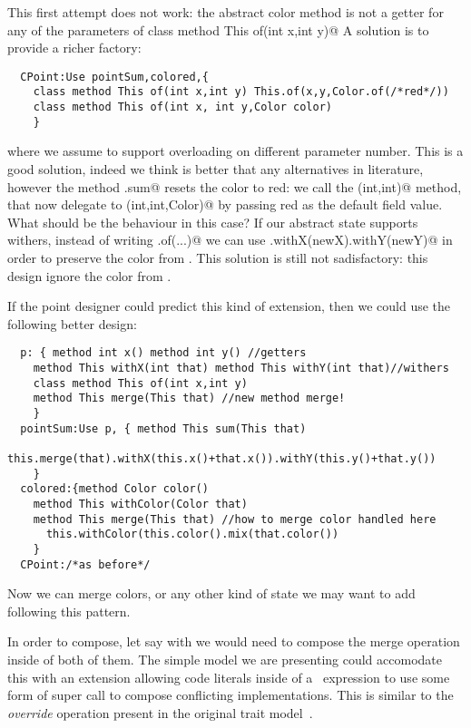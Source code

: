 This first attempt does not work: the abstract color method
is not a getter for any of the parameters of 
\Q@ class method This of(int x,int y)@
A solution is to provide a richer factory:

\begin{lstlisting}
  CPoint:Use pointSum,colored,{
    class method This of(int x,int y) This.of(x,y,Color.of(/*red*/))
    class method This of(int x, int y,Color color)
    }
\end{lstlisting}

where we assume to support overloading on different parameter number.
This is a good solution, indeed we think is better that any alternatives in literature,
however the method \Q@CPoint.sum@ resets the color to red: we call the \Q@of(int,int)@ method, that now delegate to \Q@of(int,int,Color)@ by passing red as the default field value.
What should be the behaviour in this case?
If our abstract state supports withers, instead of writing \Q@This.of(...)@ we can use
\Q@this.withX(newX).withY(newY)@ in order to preserve the color from \Q@this@.
This solution is still not sadisfactory: this design ignore the color from \Q@that@.

If the point designer could predict this kind of extension, then we could use the following better design:  
\begin{lstlisting}
  p: { method int x() method int y() //getters
    method This withX(int that) method This withY(int that)//withers
    class method This of(int x,int y)
    method This merge(This that) //new method merge!
    }
  pointSum:Use p, { method This sum(This that)
      this.merge(that).withX(this.x()+that.x()).withY(this.y()+that.y())
    }
  colored:{method Color color()
    method This withColor(Color that)
    method This merge(This that) //how to merge color handled here
      this.withColor(this.color().mix(that.color())
    }
  CPoint:/*as before*/
\end{lstlisting}  
  Now we can merge colors, or any other kind of state we may want to add
  following this pattern.
  
  In order to compose, let say \Q@colored@ with \Q@flavored@ we would
  need to compose the merge operation inside of both of them.
  The simple model we are presenting could accomodate this with an
  extension allowing code literals inside of a \use\ expression to use some form of super call to compose conflicting implementations. This is similar to the \emph{override} operation present in the original trait model~\cite{ducasse2006traits}.

